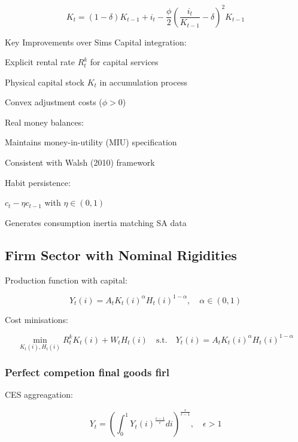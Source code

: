 \documentclass[11pt,preprint]{elsarticle}
\numberwithin{equation}{section}
\numberwithin{figure}{section}
\numberwithin{table}{section}
\begin{document}
\begin{equation}
K_t = (1 - \delta) K_{t-1} + i_t - \frac{\phi}{2} \left( \frac{i_t}{K_{t-1}} - \delta \right)^2 K_{t-1}
\end{equation}

Key Improvements over Sims Capital integration:

Explicit rental rate \(R_t^k\) for capital services

Physical capital stock \(K_t\) in accumulation process

Convex adjustment costs (\(\phi > 0\))

Real money balances:

Maintains money-in-utility (MIU) specification

Consistent with Walsh (2010) framework

Habit persistence:

\(c_t - \eta c_{t-1}\) with \(\eta \in (0,1)\)

Generates consumption inertia matching SA data

\subsection{Firm Sector with Nominal
Rigidities}\label{firm-sector-with-nominal-rigidities}

Production function with capital:

\begin{equation}
Y_t(i) = A_t K_t(i)^{\alpha} H_t(i)^{1-\alpha}, \quad \alpha \in (0,1)
\label{production}
\end{equation}

Cost minisations:

\begin{equation}
\min_{K_t(i), H_t(i)} R_t^k K_t(i) + W_t H_t(i) \quad \text{s.t.} \quad Y_t(i) = A_t K_t(i)^{\alpha} H_t(i)^{1-\alpha}
\end{equation}

\subsubsection{Perfect competion final goods
firl}\label{perfect-competion-final-goods-firl}

CES aggreagation:

\begin{equation}
Y_t = \left( \int_0^1 Y_t(i)^{\frac{\epsilon-1}{\epsilon}} di \right)^{\frac{\epsilon}{\epsilon-1}}, \quad \epsilon > 1
\label{ces_aggregator}
\end{equation}
\end{document}
